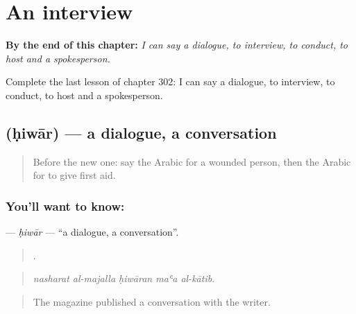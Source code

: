
\chapter{An interview}
\label{ch:ar-an-interview}

\begin{chapteropening}
\textbf{By the end of this chapter:} \emph{I can say a dialogue, to interview, to conduct, to host and a spokesperson.}

Complete the last lesson of chapter 302: I can say a dialogue, to interview, to conduct, to host and a spokesperson.
\end{chapteropening}

\section[\texorpdfstring{\ar{حوار} (ḥiwār)}{حوار (ḥiwār)}]{ (ḥiwār) — a dialogue, a conversation}

\label{lesson:AR-C302-hiwar}



\begin{quote}
Before the new one: say the Arabic for a wounded person, then the Arabic for to give first aid.
\end{quote}

\subsection*{You'll want to know: }
\textbf{} — \emph{ḥiwār} — \textquotedblleft{}a dialogue, a conversation\textquotedblright{}.

\begin{quote}
    .
\end{quote}

\begin{quote}
\emph{nasharat al-majalla ḥiwāran maʿa al-kātib.}
\end{quote}

\begin{quote}
The magazine published a conversation with the writer.
\end{quote}

